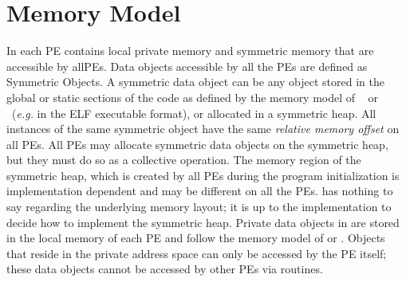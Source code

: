\section{Memory Model}

In \openshmem{} each \ac{PE } contains local private memory and  symmetric memory that 
are accessible by all\ac{PE}s. Data objects accessible by all the \ac{PE}s are defined as Symmetric Objects.
A  symmetric data object can be any object stored in the global or static sections of the code as defined by the memory model of ~\Clang{} or ~\Fortran (\emph{e.g.} in the ELF executable format), 
or allocated in a symmetric heap.  All instances of the same symmetric object have the same \textit{relative memory offset} on all \ac{PE}s. 
All \ac{PE}s may allocate symmetric data objects on the symmetric heap, but they must do so as a collective operation. 
The memory region of the symmetric heap, which is created by all \ac{PE}s during the program initialization is implementation dependent and 
may be different on all the \ac{PE}s. \openshmem has nothing
to say regarding the underlying memory layout; it is up to the implementation
to decide how to implement the symmetric heap. Private data objects in \openshmem are stored in the local memory of each \ac{PE} 
and follow the memory model of \Clang{} or \Fortran{}. Objects that reside in the private address space can only be accessed by the PE itself; these data objects
cannot be accessed by other PEs via \openshmem{} routines. 

%

